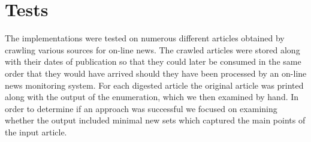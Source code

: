 \section{Tests}
The implementations were tested on numerous different articles obtained by crawling various sources for on-line news. The crawled articles were stored along with their dates of publication so that they could later be consumed in the same order that they would have arrived should they have been processed by an on-line news monitoring system. For each digested article the original article was printed along with the output of the enumeration, which we then examined by hand. In order to determine if an approach was successful we focused on examining whether the output included minimal new sets which captured the main points of the input article.

